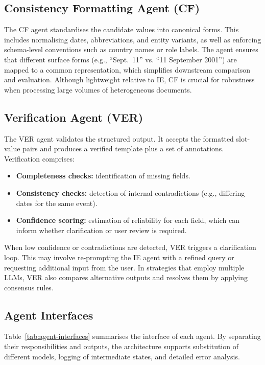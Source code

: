 \subsection{Consistency Formatting Agent (CF)}
The CF agent standardises the candidate values into canonical forms. This includes normalising dates, abbreviations, and entity variants, as well as enforcing schema-level conventions such as country names or role labels. The agent ensures that different surface forms (e.g., ``Sept.~11'' vs. ``11 September 2001'') are mapped to a common representation, which simplifies downstream comparison and evaluation. Although lightweight relative to IE, CF is crucial for robustness when processing large volumes of heterogeneous documents.

\subsection{Verification Agent (VER)}
The VER agent validates the structured output. It accepts the formatted slot-value pairs and produces a verified template plus a set of annotations. Verification comprises:
\begin{itemize}
    \item \textbf{Completeness checks:} identification of missing fields.
    \item \textbf{Consistency checks:} detection of internal contradictions (e.g., differing dates for the same event).
    \item \textbf{Confidence scoring:} estimation of reliability for each field, which can inform whether clarification or user review is required.
\end{itemize}

When low confidence or contradictions are detected, VER triggers a clarification loop. This may involve re-prompting the IE agent with a refined query or requesting additional input from the user. In strategies that employ multiple LLMs, VER also compares alternative outputs and resolves them by applying consensus rules.

\subsection{Agent Interfaces}
Table~\ref{tab:agent-interfaces} summarises the interface of each agent. By separating their responsibilities and outputs, the architecture supports substitution of different models, logging of intermediate states, and detailed error analysis.

